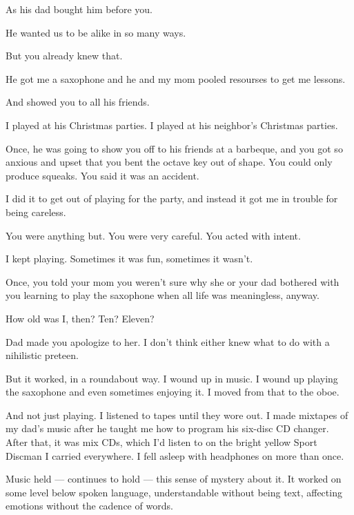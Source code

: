 \begin{paracol}{2}
\begin{leftcolumn}
\begin{ally}
As his dad bought him before you.
\end{ally}
He wanted us to be alike in so many ways.

\begin{ally}
But you already knew that.
\end{ally}
He got me a saxophone and he and my mom pooled resourses to get me lessons.

\begin{ally}
And showed you to all his friends.
\end{ally}
I played at his Christmas parties. I played at his neighbor's Christmas parties.

\begin{ally}
Once, he was going to show you off to his friends at a barbeque, and you got so anxious and upset that you bent the octave key out of shape. You could only produce squeaks. You said it was an accident.
\end{ally}
I did it to get out of playing for the party, and instead it got me in trouble for being careless.

\begin{ally}
You were anything but. You were very careful. You acted with intent.
\end{ally}
I kept playing. Sometimes it was fun, sometimes it wasn't.

\begin{ally}
Once, you told your mom you weren't sure why she or your dad bothered with you learning to play the saxophone when all life was meaningless, anyway.
\end{ally}
How old was I, then? Ten? Eleven?

\begin{ally}
Dad made you apologize to her. I don't think either knew what to do with a nihilistic preteen.
\end{ally}
But it worked, in a roundabout way. I wound up in music. I wound up playing the saxophone and even sometimes enjoying it. I moved from that to the oboe.

And not just playing. I listened to tapes until they wore out. I made mixtapes of my dad's music after he taught me how to program his six-disc CD changer. After that, it was mix CDs, which I'd listen to on the bright yellow Sport Discman I carried everywhere. I fell asleep with headphones on more than once.

Music held --- continues to hold --- this sense of mystery about it. It worked on some level below spoken language, understandable without being text, affecting emotions without the cadence of words.


\end{leftcolumn}
\end{paracol}
